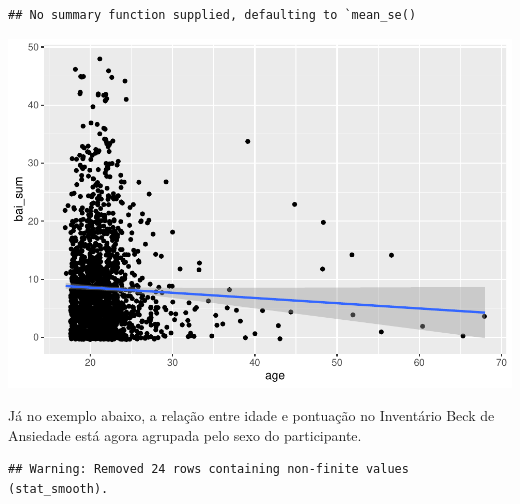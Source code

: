\documentclass[
]{book}
\newenvironment{Shaded}{\begin{snugshade}}{\end{snugshade}}
\newcommand{\DataTypeTok}[1]{\textcolor[rgb]{0.13,0.29,0.53}{#1}}
\newcommand{\KeywordTok}[1]{\textcolor[rgb]{0.13,0.29,0.53}{\textbf{#1}}}
\newcommand{\NormalTok}[1]{#1}
\newcommand{\OperatorTok}[1]{\textcolor[rgb]{0.81,0.36,0.00}{\textbf{#1}}}
\newcommand{\StringTok}[1]{\textcolor[rgb]{0.31,0.60,0.02}{#1}}
\begin{document}
\begin{verbatim}
## No summary function supplied, defaulting to `mean_se()
\end{verbatim}

\includegraphics{gitbook-demo_files/figure-latex/unnamed-chunk-24-1.pdf}

Já no exemplo abaixo, a relação entre idade e pontuação no Inventário Beck de Ansiedade está agora agrupada pelo sexo do participante.

\begin{Shaded}
\end{Shaded}

\begin{verbatim}
## Warning: Removed 24 rows containing non-finite values (stat_smooth).
\end{verbatim}
\end{document}
